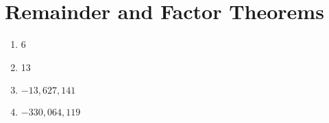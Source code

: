 \section*{Remainder and Factor Theorems}

\begin{enumerate}
	\item 6
	\item 13
	\item $-13,627,141$
    \item $-330,064,119$
\end{enumerate}